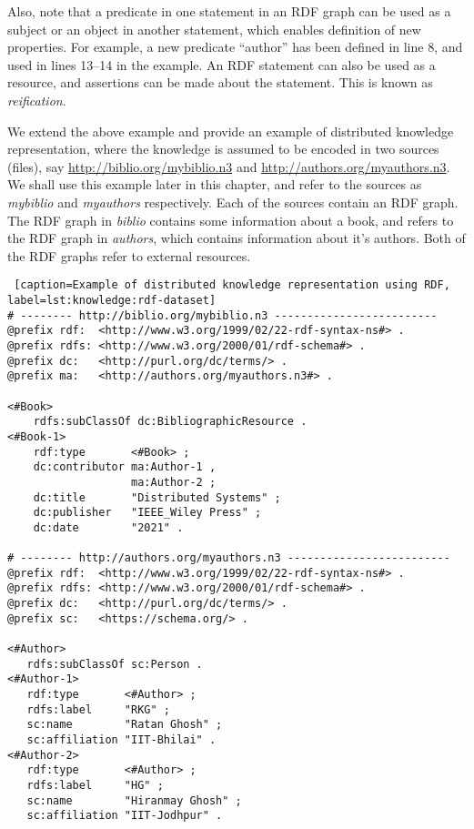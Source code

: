 Also, note that a predicate in one statement in an RDF graph can be used as a subject 
or an object in another statement, which enables definition of new properties. For example, a new predicate ``author'' has been 
defined in line 8, and used in lines 13--14 in the example. An RDF statement can also be used as a resource, and assertions can
be made about the statement. This is known as {\it reification}.

We extend the above example and provide an example of distributed knowledge representation, where the knowledge is assumed to be encoded 
in two sources (files), say \url{http://biblio.org/mybiblio.n3} and \url{http://authors.org/myauthors.n3}. We shall use this example 
later in this chapter, and refer to the sources as {\it mybiblio} and {\it myauthors} respectively. Each of the sources contain an RDF 
graph. The RDF graph in {\it biblio} contains some information about a book, and refers to the RDF graph in {\it authors}, which 
contains information about it's authors. Both of the RDF graphs refer to external resources.

\begin{lstlisting} [caption=Example of distributed knowledge representation using RDF, label=lst:knowledge:rdf-dataset]
# -------- http://biblio.org/mybiblio.n3 -------------------------
@prefix rdf:  <http://www.w3.org/1999/02/22-rdf-syntax-ns#> .
@prefix rdfs: <http://www.w3.org/2000/01/rdf-schema#> .
@prefix dc:   <http://purl.org/dc/terms/> .                    
@prefix ma:   <http://authors.org/myauthors.n3#> .

<#Book>
    rdfs:subClassOf dc:BibliographicResource .
<#Book-1>
    rdf:type       <#Book> ;
    dc:contributor ma:Author-1 ,
                   ma:Author-2 ;
    dc:title       "Distributed Systems" ;
    dc:publisher   "IEEE_Wiley Press" ;
    dc:date        "2021" .

# -------- http://authors.org/myauthors.n3 -------------------------
@prefix rdf:  <http://www.w3.org/1999/02/22-rdf-syntax-ns#> .
@prefix rdfs: <http://www.w3.org/2000/01/rdf-schema#> .
@prefix dc:   <http://purl.org/dc/terms/> .                    
@prefix sc:   <https://schema.org/> .

<#Author>
   rdfs:subClassOf sc:Person .
<#Author-1>
   rdf:type       <#Author> ;
   rdfs:label     "RKG" ;
   sc:name        "Ratan Ghosh" ;
   sc:affiliation "IIT-Bhilai" .
<#Author-2>
   rdf:type       <#Author> ;
   rdfs:label     "HG" ;
   sc:name        "Hiranmay Ghosh" ;
   sc:affiliation "IIT-Jodhpur" .
\end{lstlisting}

